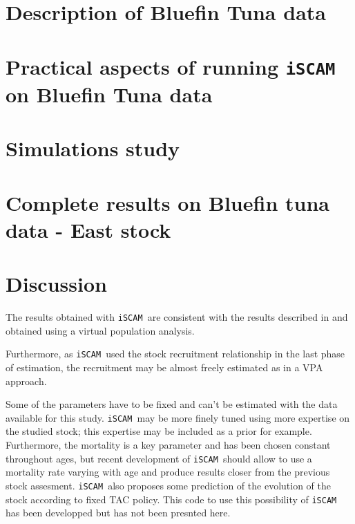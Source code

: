 \documentclass[a4paper]{article}\usepackage{graphicx, color}
\newcommand{\iscam}{\texttt{iSCAM }}
\begin{document}
\section{Description of Bluefin Tuna data}


\clearpage
\section{Practical aspects of running \iscam on Bluefin Tuna data}


\clearpage
\section{Simulations study}
\label{sec:simulation}


\section{Complete results on Bluefin tuna data - East stock}
\label{sec:results}


\section{Discussion}
\label{sec:concl}

The results obtained with \iscam are consistent with the results described in \cite{tuna2012} and obtained using a virtual population analysis.

Furthermore, as \iscam used the stock recruitment relationship in the last phase of estimation, the recruitment may be almost freely estimated as in a VPA approach. 


Some of the parameters have to be fixed and can't be estimated with the data available for this study.
\iscam may be more finely tuned using more expertise on the studied stock; this expertise may be included as a prior for example.
Furthermore, the mortality is a key parameter and has been chosen constant throughout ages, but recent development of \iscam should allow to use a mortality rate varying with age and produce results closer from the previous stock assesment.
\iscam also proposes some prediction of the evolution of the stock according to fixed TAC policy. This code to use this possibility of \iscam has been developped but has not been presnted here.

%


\end{document}
